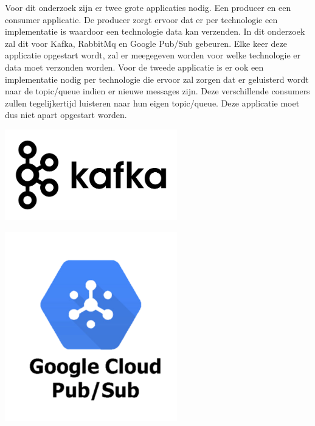 \documentclass[a0,portrait]{a0poster}
\begin{document}
\begin{multicols}{2}
Voor dit onderzoek zijn er twee grote applicaties nodig. Een producer en een consumer applicatie. De producer zorgt ervoor dat er per technologie een implementatie is waardoor een technologie data kan verzenden. In dit onderzoek zal dit voor Kafka, RabbitMq en Google Pub/Sub gebeuren. Elke keer deze applicatie opgestart wordt, zal er meegegeven worden voor welke technologie er data moet verzonden worden.
Voor de tweede applicatie is er ook een implementatie nodig per technologie die ervoor zal zorgen dat er geluisterd wordt naar de topic/queue indien er nieuwe messages zijn. Deze verschillende consumers zullen tegelijkertijd luisteren naar hun eigen topic/queue. Deze applicatie moet dus niet apart opgestart worden.
\begin{center}
    \begin{minipage}[t]{0.32\linewidth}
         \includegraphics[width= 75mm]{kafka-logo-wide.png}
        \label{l}
    \end{minipage}\hfill
    \begin{minipage}[t]{0.32\linewidth}
         \includegraphics[width=75mm]{pubsub}
        

\end{minipage}
\end{center}
\end{multicols}
\end{document}
